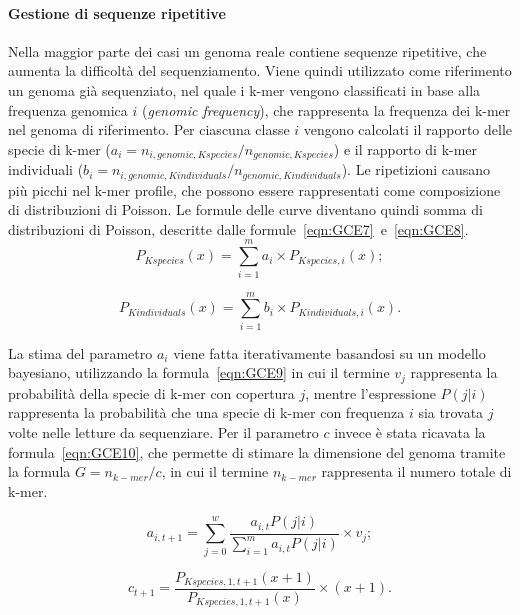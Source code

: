 \documentclass[crop=false, class=book]{standalone}
\begin{document}
	\paragraph{Gestione di sequenze ripetitive}
	Nella maggior parte dei casi un genoma reale contiene sequenze ripetitive, che aumenta la difficoltà del sequenziamento. Viene quindi utilizzato come riferimento un genoma già sequenziato, nel quale i k-mer vengono classificati in base alla frequenza genomica $i$ (\textit{genomic frequency}), che rappresenta la frequenza dei k-mer nel genoma di riferimento. Per ciascuna classe $i$ vengono calcolati il rapporto delle specie di k-mer ($a_i = n_{i, genomic, Kspecies} / n_{genomic, Kspecies}$) e il rapporto di k-mer individuali ($b_i = n_{i, genomic, Kindividuals} / n_{genomic, Kindividuals}$). 
	Le ripetizioni causano più picchi nel k-mer profile, che possono essere rappresentati come composizione di distribuzioni di Poisson. Le formule delle curve diventano quindi somma di distribuzioni di Poisson, descritte dalle formule~\vref{eqn:GCE7}~e~\vref{eqn:GCE8}.
	\begin{equation}
		\label{eqn:GCE7}
		P_{Kspecies}(x) = \sum_{i=1}^{m} a_i \times P_{Kspecies, i}(x);
	\end{equation}
	
	\begin{equation}
		\label{eqn:GCE8}
		P_{Kindividuals}(x) = \sum_{i=1}^{m} b_i \times P_{Kindividuals, i}(x).
	\end{equation}
	
	La stima del parametro $a_i$ viene fatta iterativamente basandosi su un modello bayesiano, utilizzando la formula~\vref{eqn:GCE9} in cui il termine $v_j$ rappresenta la probabilità della specie di k-mer con copertura $j$, mentre l'espressione $P(j|i)$ rappresenta la probabilità che una specie di k-mer con frequenza $i$ sia trovata $j$ volte nelle letture da sequenziare. Per il parametro $c$ invece è stata ricavata la formula~\vref{eqn:GCE10}, che permette di stimare la dimensione del genoma tramite la formula $G = n_{k-mer}/c$, in cui il termine $ n_{k-mer}$ rappresenta il numero totale di k-mer.
	
	\begin{equation}
		\label{eqn:GCE9}
		a_{i,t+1} = \sum_{j=0}^{w} \frac{a_{i,t} P(j|i)}{\sum_{i=1}^{m} a_{i,t} P(j|i)} \times v_j;
	\end{equation}

	\begin{equation}
		\label{eqn:GCE10}
		c_{t+1} = \frac{P_{Kspecies, 1, t+1}(x+1)}{P_{Kspecies, 1, t+1}(x)} \times (x+1).
	\end{equation}
	
\end{document}
